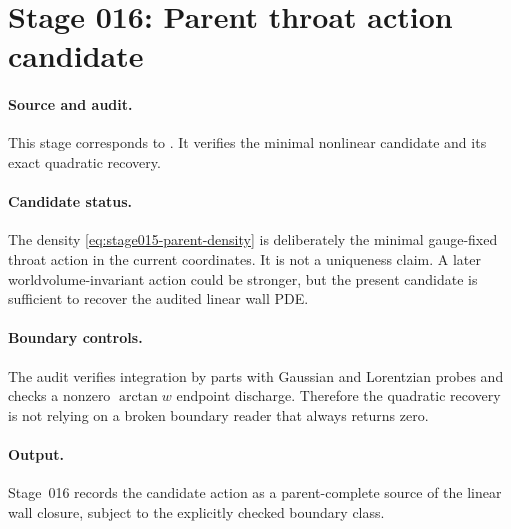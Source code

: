 \section[Stage 016]{Stage 016: Parent throat action candidate}
\label{stage:016}


\paragraph{Source and audit.}
This stage corresponds to
.
It verifies the minimal nonlinear candidate and its exact quadratic recovery.

\paragraph{Candidate status.}
The density \eqref{eq:stage015-parent-density} is deliberately the minimal
gauge-fixed throat action in the current coordinates.  It is not a uniqueness
claim.  A later worldvolume-invariant action could be stronger, but the
present candidate is sufficient to recover the audited linear wall PDE.

\paragraph{Boundary controls.}
The audit verifies integration by parts with Gaussian and Lorentzian probes
and checks a nonzero \(\arctan w\) endpoint discharge.  Therefore the
quadratic recovery is not relying on a broken boundary reader that always
returns zero.

\paragraph{Output.}
Stage~016 records the candidate action as a parent-complete source of the
linear wall closure, subject to the explicitly checked boundary class.
